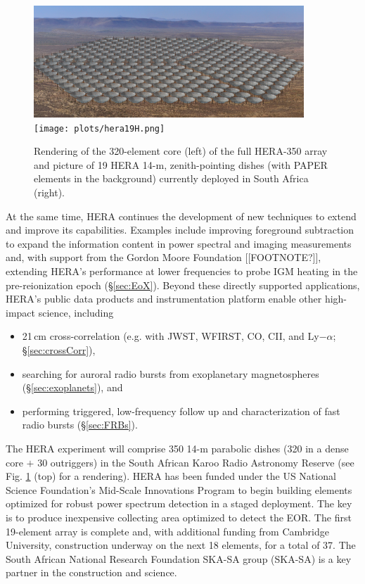 \documentclass[preprint,11pt]{aastex}
\begin{document}
\begin{figure}[h!]
	\centering
	\includegraphics[width=4in]{plots/hera_render.png}
	\texttt{[image: plots/hera19H.png]}
	\caption{Rendering of the 320-element core (left) of the full HERA-350 array and picture of 19 HERA 14-m, zenith-pointing dishes (with PAPER elements in the background) currently deployed in South Africa (right).} 
	\label{fig:HERApictures}
\end{figure}

At the same time, HERA continues the development of new techniques to extend and improve its capabilities.
Examples include improving foreground subtraction to expand the information content 
in power spectral and imaging measurements and, with support from the Gordon Moore Foundation [[FOOTNOTE?]],
extending HERA's performance at lower frequencies to probe IGM heating in the pre-reionization epoch (\S\ref{sec:EoX}).
Beyond these directly supported applications, HERA's public data products and instrumentation platform enable other high-impact science, including 
\begin{itemize}[noitemsep,nolistsep]
\item 21\,cm cross-correlation (e.g. with JWST, WFIRST, CO, CII, and Ly$-\alpha$; \S\ref{sec:crossCorr}),
\item searching for auroral radio bursts from exoplanetary magnetospheres (\S\ref{sec:exoplanets}), and
\item performing triggered, low-frequency follow up and characterization of fast radio bursts (\S\ref{sec:FRBs}).
\end{itemize}

The HERA experiment will comprise 
350 14-m parabolic dishes (320 in a dense core $+$ 30 outriggers) in the South African Karoo Radio
Astronomy Reserve (see Fig. \ref{fig:HERApictures} (top) for a rendering).
HERA has been funded under the US National Science Foundation's Mid-Scale Innovations Program to begin building elements optimized for robust power spectrum detection in a 
staged deployment.  The key is to produce inexpensive collecting area optimized to detect the EOR.  
The first 19-element array is complete and, with additional funding from Cambridge University, construction underway on the next 18 elements, for a total of 37.
The South African National Research Foundation SKA-SA group (SKA-SA) is a key partner in the construction and science.
\end{document}
